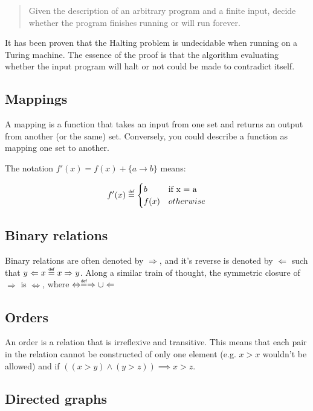 \begin{quotation}
  Given the description of an arbitrary program and a finite input, decide
  whether the program finishes running or will run forever.
\end{quotation}

It has been proven that the Halting problem is undecidable when running on a
Turing machine. The essence of the proof is that the algorithm evaluating
whether the input program will halt or not could be made to contradict itself.

\subsection{Mappings}

A mapping is a function that takes an input from one set and returns an output
from another (or the same) set. Conversely, you could describe a function as
mapping one set to another.

The notation $ f'(x) = f(x) + \{ a \rightarrow b\}$ means:

\[
  f'(x) \definedas
  \begin{cases}
    b    & \text{if x = a}\\
    f(x) & otherwise
  \end{cases}
\]

\subsection{Binary relations}

Binary relations are often denoted by $\Rightarrow$, and it's reverse is denoted
by $\Leftarrow$ such that $y \Leftarrow x \definedas x \Rightarrow y$. Along a
similar train of thought, the symmetric closure of $\Rightarrow$ is
$\Leftrightarrow$, where $\Leftrightarrow \definedas \Rightarrow \cup
\Leftarrow$

\subsection{Orders}

An order is a relation that is irreflexive and transitive. This means that each
pair in the relation cannot be constructed of only one element (e.g. $x > x$
wouldn't be allowed) and if $((x > y) \wedge (y > z)) \implies x > z$.

\subsection{Directed graphs}

